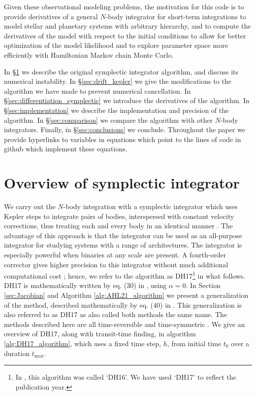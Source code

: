 \documentclass[fleqn,usenatbib,twocolumn]{mnras}
\newcommand   {\change}[1] {{\color{black}{#1}}}
\begin{document}
Given these observational modeling problems, the motivation for this code is to
provide derivatives of a general $N$-body integrator for short-term
integrations to model stellar and planetary systems with arbitrary
hierarchy, and to compute the derivatives of the model with respect
to the initial conditions to allow for better optimization of
the model likelihood and to explore parameter space more efficiently
with Hamiltonian Markov chain Monte Carlo.

In \S \ref{sec:symplectic_integrator} we describe the original symplectic integrator algorithm, and discuss its numerical instability.  In \S \ref{sec:drift_kepler}
we give the modifications to the algorithm we have made to prevent numerical cancellation. In \S \ref{sec:differentiation_symplectic} we
introduce the derivatives of the algorithm.  In \S \ref{sec:implementation} we describe the implementation and precision of the algorithm.  In \S \ref{sec:comparison} we compare the algorithm with other $N$-body integrators.  Finally, in \S \ref{sec:conclusions} we conclude.  Throughout the paper we provide hyperlinks to variables in equations which point to the lines of code in github which implement these equations.

\section{Overview of symplectic integrator} \label{sec:symplectic_integrator}

We carry out the $N$-body integration with a symplectic integrator \citep{Channell1991}
which uses Kepler steps to integrate pairs of bodies, interspersed with constant
velocity corrections, thus treating each and every body in an identical
manner \citep{Hernandez2015}. The
advantage of this approach \change{relative to the {\sc WH} method} is that the integrator can be used as an
all-purpose integrator for studying systems with a range of architectures.
The integrator is especially powerful when binaries at any scale are present.
A fourth-order corrector gives higher precision to this integrator without
much additional computational cost \citep{Dehnen2017}; hence, we refer
to the algorithm as DH17\footnote{{In \cite{Dehnen2017}, this algorithm
was called `DH16'.  We have used `DH17' to reflect the publication year.}} in
what follows.  {DH17 is mathematically written by eq. (30) in \cite{Dehnen2017},
using $\alpha = 0$.  In Section \ref{sec:Jacobian} and Algorithm \ref{alg:AHL21_algorithm} we
present a generalization of the method, described mathematically by eq. (40) in
\cite{Dehnen2017}.  This generalization is also referred to as DH17 as
\cite{Dehnen2017} also called both methods the same name.}  The methods described here are all time-reversible and time-symmetric \citep{Hairer2006,Hernandez2018}.
We give an overview of DH17, along with transit-time finding, in algorithm \ref{alg:DH17_algorithm},
which uses a fixed time step, $h$, from initial time $t_0$ over a duration $t_\mathrm{max}$.
\end{document}
